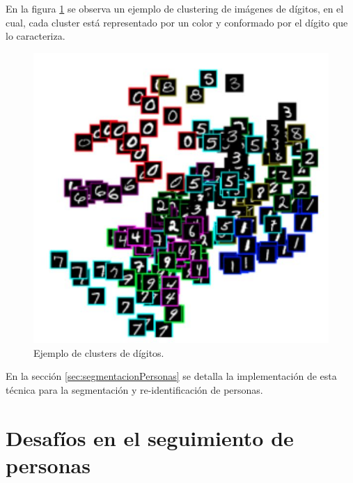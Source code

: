 En la figura \ref{fig:clusterDigitos} se observa un ejemplo de clustering de imágenes de dígitos, en el cual, cada cluster está representado por un color y conformado por el dígito que lo caracteriza.

\begin{figure}[ht]
	\centering
	\includegraphics[scale=0.7]{./Figures/clusterDigitos.jpg}
	\caption{Ejemplo de clusters de dígitos\protect\footnotemark.}
	\label{fig:clusterDigitos}
\end{figure}


En la sección \ref{sec:segmentacionPersonas} se detalla la implementación de esta técnica para la segmentación y re-identificación de personas.

\newpage


\section{Desafíos en el seguimiento de personas}
\label{sec:desafiosSeguimiento}

